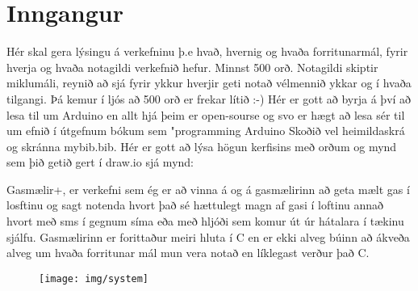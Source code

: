 \section{Inngangur}
Hér skal gera lýsingu á verkefninu þ.e hvað,  hvernig og  hvaða forritunarmál, fyrir hverja og hvaða notagildi verkefnið hefur. Minnst 500 orð. Notagildi skiptir miklumáli, reynið að sjá fyrir ykkur hverjir geti notað vélmennið ykkar og í hvaða tilgangi.  Þá kemur í ljós að 500 orð er frekar lítið :-) Hér er gott að byrja á því að lesa til um Arduino en allt hjá þeim er open-sourse og svo er hægt að lesa sér til um efnið í útgefnum bókum sem "programming Arduino \cite{monk} Skoðið vel heimildaskrá og skránna mybib.bib. Hér er gott að lýsa högun kerfisins með orðum og mynd sem þið getið gert í draw.io sjá mynd: 

Gasmælir+, er verkefni sem ég er að vinna á og á gasmælirinn að geta mælt gas í losftinu og sagt notenda hvort það sé hættulegt magn af gasi í loftinu annað hvort með sms í gegnum síma eða með hljóði sem komur út úr hátalara í tækinu sjálfu. Gasmælirinn er forittaður meiri hluta í C en er ekki alveg búinn að ákveða alveg um hvaða forritunar mál mun vera notað en líklegast verður það C. 
\begin{figure}[h]
\texttt{[image: img/system]}
\end{figure}